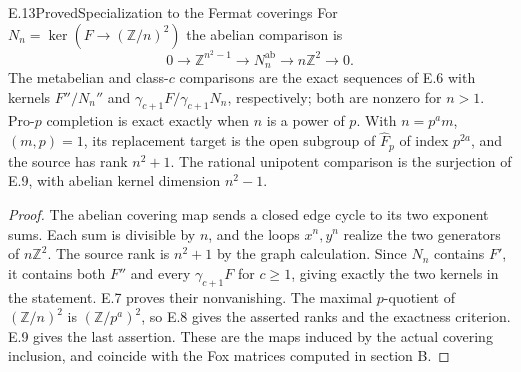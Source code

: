 \begin{statement}{E.13}{Proved}{Specialization to the Fermat coverings}
For $N_n=\ker(F\to(\mathbb Z/n)^2)$ the abelian comparison is
\[
 0\longrightarrow\mathbb Z^{n^2-1}
 \longrightarrow N_n^{\mathrm{ab}}
 \longrightarrow n\mathbb Z^2\longrightarrow0.
\]
The metabelian and class-$c$ comparisons are the exact sequences
of E.6 with kernels $F''/N_n''$ and
$\gamma_{c+1}F/\gamma_{c+1}N_n$, respectively; both are nonzero
for $n>1$. Pro-$p$ completion is exact exactly when $n$ is a
power of $p$. With $n=p^a m$, $(m,p)=1$, its replacement target
is the open subgroup of $\widehat F_p$ of index $p^{2a}$, and
the source has rank $n^2+1$. The rational unipotent comparison
is the surjection of E.9, with abelian kernel dimension $n^2-1$.
\end{statement}
\begin{proof}
The abelian covering map sends a closed edge cycle to its two
exponent sums. Each sum is divisible by $n$, and the loops
$x^n,y^n$ realize the two generators of $n\mathbb Z^2$.
The source rank is $n^2+1$ by the graph calculation. Since
$N_n$ contains $F'$, it contains both $F''$ and every
$\gamma_{c+1}F$ for $c\geq1$, giving exactly the two kernels
in the statement. E.7 proves their nonvanishing. The maximal
$p$-quotient of $(\mathbb Z/n)^2$ is $(\mathbb Z/p^a)^2$,
so E.8 gives the asserted ranks and the exactness criterion.
E.9 gives the last assertion. These are the maps induced by
the actual covering inclusion, and coincide with the Fox
matrices computed in section B.
\end{proof}

